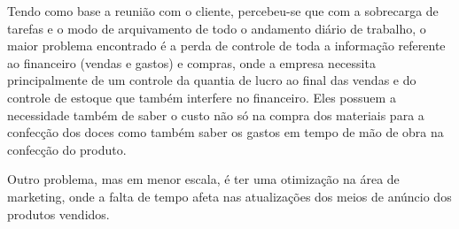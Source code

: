 Tendo como base a reunião com o cliente, percebeu-se que com a sobrecarga de tarefas e o modo de arquivamento de todo o andamento diário de trabalho, o maior problema encontrado é a perda de controle de toda a informação referente ao financeiro (vendas e gastos) e compras, onde a empresa necessita principalmente de um controle da quantia de lucro ao final das vendas e do controle de estoque que também interfere no financeiro. Eles possuem a necessidade também de saber o custo não só na compra dos materiais para a confecção dos doces como também saber os gastos em tempo de mão de obra na confecção do produto.

Outro problema, mas em menor escala, é ter uma otimização na área de marketing, onde a falta de tempo afeta nas atualizações dos meios de anúncio dos produtos vendidos.